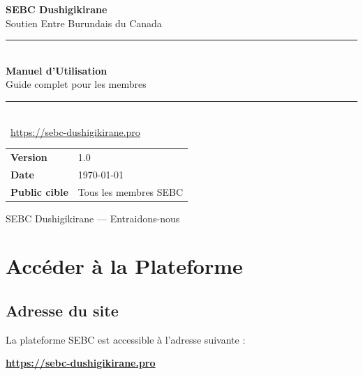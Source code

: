 \documentclass[12pt,a4paper]{article}
\begin{document}
\begin{titlepage}
\begin{center}
\vspace*{2cm}

{\Huge\bfseries\color{sebcblue} SEBC Dushigikirane}\\[0.5cm]
{\Large\color{sebcblulight} Soutien Entre Burundais du Canada}\\[2cm]

\rule{\textwidth}{2pt}\\[0.8cm]
{\LARGE\bfseries Manuel d'Utilisation}\\[0.3cm]
{\large\color{sebcgray} Guide complet pour les membres}\\[0.5cm]
\rule{\textwidth}{2pt}\\[2cm]

{\large\color{sebcgray}
\faGlobe\ \url{https://sebc-dushigikirane.pro}\\[1cm]
}

\begin{tabular}{ll}
\textbf{Version} & 1.0 \\
\textbf{Date} & \today \\
\textbf{Public cible} & Tous les membres SEBC \\
\end{tabular}

\vfill
{\small\color{sebcgray} SEBC Dushigikirane — Entraidons-nous}
\end{center}
\end{titlepage}

\tableofcontents
\newpage

\section{Accéder à la Plateforme}

\subsection{Adresse du site}

La plateforme SEBC est accessible à l'adresse suivante :

\begin{center}
\large\textbf{\url{https://sebc-dushigikirane.pro}}
\end{center}
\end{document}
